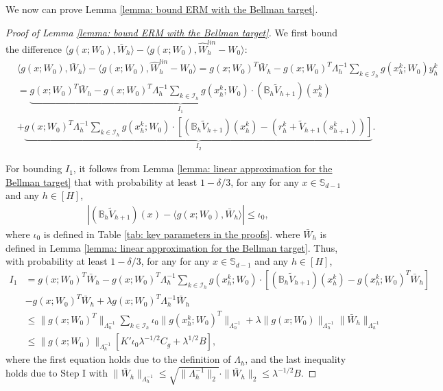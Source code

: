 \documentclass{article} \usepackage{iclr2023/iclr2023_conference,times}
\begin{document}
We now can prove Lemma \ref{lemma: bound ERM with the Bellman target}. 
\begin{proof}[Proof of Lemma \ref{lemma: bound ERM with the Bellman target}]

We first bound the difference $\langle g(x; W_0), \bar{W}_h \rangle -  \langle g(x; W_0), \hat{W}^{lin}_h - W_0 \rangle$:
\begin{align*}
    &\langle g(x; W_0), \bar{W}_h \rangle -  \langle g(x; W_0), \hat{W}^{lin}_h - W_0 \rangle = g(x; W_0)^T \bar{W}_h - g(x; W_0)^T \Lambda_h^{-1} \sum_{k \in \mathcal{I}_h} g(x^k_h; W_0) y^k_h \\
    &= \underbrace{ g(x; W_0)^T \bar{W}_h - g(x; W_0)^T \Lambda_h^{-1} \sum_{k \in \mathcal{I}_h} g(x^k_h; W_0) \cdot (\mathbb{B}_h \tilde{V}_{h+1})(x^k_h) }_{I_1}\\ 
    &+ \underbrace{g(x; W_0)^T \Lambda_h^{-1} \sum_{k \in \mathcal{I}_h} g(x^k_h; W_0) \cdot \left[ (\mathbb{B}_h \tilde{V}_{h+1})(x^k_h)  - (r^k_h + \tilde{V}_{h+1}(s^k_{h+1}))\right] }_{I_2}. 
\end{align*}

For bounding $I_1$, it follows from Lemma \ref{lemma: linear approximation for the Bellman target} that with probability at least $1 - \delta / 3$, for any for any $x \in \mathbb{S}_{d-1}$ and any $h \in [H]$, 
\begin{align*}
    |(\mathbb{B}_h \tilde{V}_{h+1})(x) - \langle g(x; W_0), \bar{W}_h \rangle | \leq \iota_0, 
\end{align*}
where $\iota_0$ is defined in Table \ref{tab: key parameters in the proofs}.
where $\bar{W}_h$ is defined in Lemma \ref{lemma: linear approximation for the Bellman target}. 
Thus, with probability at least $1 - \delta/3$, for any for any $x \in \mathbb{S}_{d-1}$ and any $h \in [H]$, 
\begin{align}
    I_1 &= g(x; W_0)^T \bar{W}_h - g(x; W_0)^T \Lambda_h^{-1} \sum_{k \in \mathcal{I}_h} g(x^k_h; W_0) \cdot \left[ (\mathbb{B}_h \tilde{V}_{h+1})(x^k_h) - g(x^k_h; W_0)^T \bar{W}_h \right] \nonumber \\
    &- g(x; W_0)^T \bar{W}_h + \lambda g(x; W_0)^T \Lambda_h^{-1} \bar{W}_h \nonumber \\
    &\leq \| g(x; W_0)^T \|_{\Lambda_h^{-1} } \sum_{k \in \mathcal{I}_h} \iota_0 \| g(x^k_h; W_0)^T \|_{\Lambda_h^{-1} }  + \lambda  \| g(x; W_0) \|_{ \Lambda_h^{-1} } \| \bar{W}_h \|_{ \Lambda_h^{-1} } \nonumber \\ 
    &\leq  \| g(x; W_0) \|_{\Lambda_h^{-1} } \left[ K' \iota_0 \lambda^{-1/2} C_g + \lambda^{1/2}  B \right],
    \label{eq: bound I1}
\end{align}
where the first equation holds due to the definition of $\Lambda_h$, and the last inequality holds due to Step I with $\| \bar{W}_h \|_{\Lambda_h^{-1}} \leq \sqrt{ \| \Lambda_h^{-1}\|_2} \cdot \| \bar{W}_h \|_2 \leq \lambda^{-1/2} B $. 


\end{proof}
\end{document}
